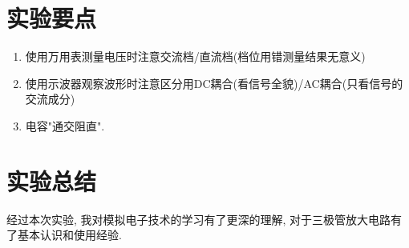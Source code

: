 \documentclass[a4paper]{article}
\begin{document}
	\section{实验要点}
	\begin{enumerate}
		\item 使用万用表测量电压时注意交流档/直流档(档位用错测量结果无意义)
		\item 使用示波器观察波形时注意区分用DC耦合(看信号全貌)/AC耦合(只看信号的交流成分)
		\item 电容"通交阻直". 
	\end{enumerate}

	\section{实验总结}
	经过本次实验, 我对模拟电子技术的学习有了更深的理解, 对于三极管放大电路有了基本认识和使用经验. 
\end{document}
